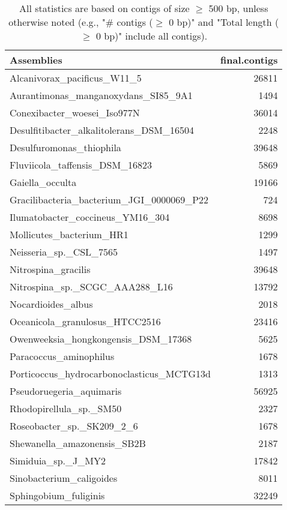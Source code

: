 \documentclass[12pt,a4paper]{article}
\begin{document}
\begin{table}[ht]
\begin{center}
\caption{All statistics are based on contigs of size $\geq$ 500 bp, unless otherwise noted (e.g., "\# contigs ($\geq$ 0 bp)" and "Total length ($\geq$ 0 bp)" include all contigs).}
\begin{tabular}{|l*{1}{|r}|}
\hline
Assemblies & final.contigs \\ \hline
Alcanivorax\_pacificus\_W11\_5 & 26811 \\ \hline
Aurantimonas\_manganoxydans\_SI85\_9A1 & 1494 \\ \hline
Conexibacter\_woesei\_Iso977N & 36014 \\ \hline
Desulfitibacter\_alkalitolerans\_DSM\_16504 & 2248 \\ \hline
Desulfuromonas\_thiophila & 39648 \\ \hline
Fluviicola\_taffensis\_DSM\_16823 & 5869 \\ \hline
Gaiella\_occulta & 19166 \\ \hline
Gracilibacteria\_bacterium\_JGI\_0000069\_P22 & 724 \\ \hline
Ilumatobacter\_coccineus\_YM16\_304 & 8698 \\ \hline
Mollicutes\_bacterium\_HR1 & 1299 \\ \hline
Neisseria\_sp.\_CSL\_7565 & 1497 \\ \hline
Nitrospina\_gracilis & 39648 \\ \hline
Nitrospina\_sp.\_SCGC\_AAA288\_L16 & 13792 \\ \hline
Nocardioides\_albus & 2018 \\ \hline
Oceanicola\_granulosus\_HTCC2516 & 23416 \\ \hline
Owenweeksia\_hongkongensis\_DSM\_17368 & 5625 \\ \hline
Paracoccus\_aminophilus & 1678 \\ \hline
Porticoccus\_hydrocarbonoclasticus\_MCTG13d & 1313 \\ \hline
Pseudoruegeria\_aquimaris & 56925 \\ \hline
Rhodopirellula\_sp.\_SM50 & 2327 \\ \hline
Roseobacter\_sp.\_SK209\_2\_6 & 1678 \\ \hline
Shewanella\_amazonensis\_SB2B & 2187 \\ \hline
Simiduia\_sp.\_J\_MY2 & 17842 \\ \hline
Sinobacterium\_caligoides & 8011 \\ \hline
Sphingobium\_fuliginis & 32249 \\ \hline

\end{tabular}
\end{center}
\end{table}
\end{document}
